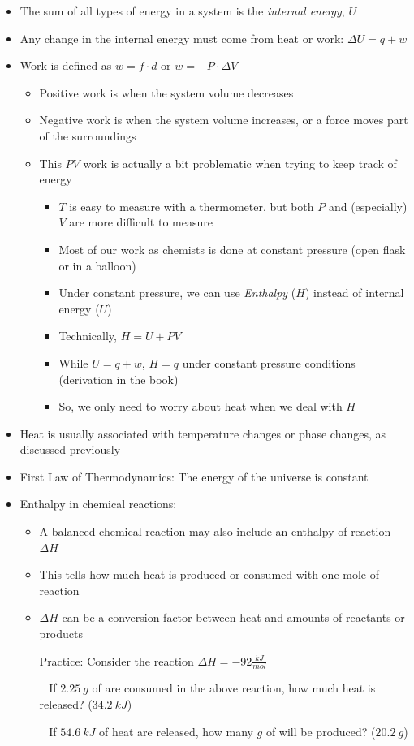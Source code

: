 \documentclass[12pt, openany, letterpaper]{memoir}
\begin{document}
\begin{itemize}
  \item The sum of all types of energy in a system is the \emph{internal energy}, $U$
  \item Any change in the internal energy must come from heat or work: $\Delta U=q+w$
  \item Work is defined as $w=f\cdot d$ or $w=-P\cdot\Delta V$
    \begin{itemize}
      \item Positive work is when the system volume decreases
      \item Negative work is when the system volume increases, or a force moves part of the surroundings
      \item This $PV$ work is actually a bit problematic when trying to keep track of energy
        \begin{itemize}
		      \item $T$ is easy to measure with a thermometer, but both $P$ and (especially) $V$ are more difficult to measure
		      \item Most of our work as chemists is done at constant pressure (open flask or in a balloon)
		      \item Under constant pressure, we can use \emph{Enthalpy} ($H$) instead of internal energy ($U$)
          \item Technically, $H=U+PV$
		      \item While $U=q+w$, $H=q$ under constant pressure conditions (derivation in the book)
		      \item So, we only need to worry about heat when we deal with $H$
	      \end{itemize}
    \end{itemize}
	\item Heat is usually associated with temperature changes or phase changes, as discussed previously
	\item First Law of Thermodynamics: The energy of the universe is constant 
  \item Enthalpy in chemical reactions:
  \begin{itemize}
    \item A balanced chemical reaction may also include an enthalpy of reaction $\Delta H$
    \item This tells how much heat is produced or consumed with one mole of reaction
    \item $\Delta H$ can be a conversion factor between heat and amounts of reactants or products

          Practice: Consider the reaction  $\Delta H = -92\frac{kJ}{mol}$

          ~\hphantom{Practice:} If $2.25~g$ of  are consumed in the above reaction, how much heat is released? ($34.2~kJ$)

          ~\hphantom{Practice:} If $54.6~kJ$ of heat are released, how many $g$ of  will be produced? ($20.2~g$)
  \end{itemize}
\end{itemize}
\end{document}
